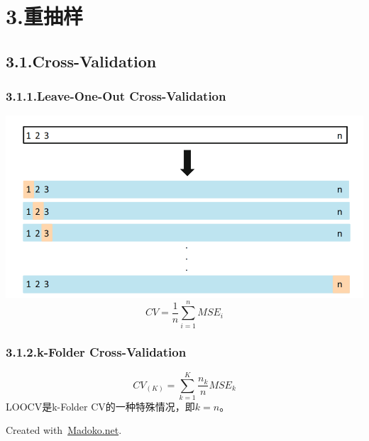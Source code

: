 \documentclass{article}
\begin{document}
{%
\section{3.\hspace*{0.5em}重抽样}\label{section}%

\subsection{3.1.\hspace*{0.5em}Cross-Validation}\label{sec-cross-validation}%

\subsubsection{3.1.1.\hspace*{0.5em}Leave-One-Out Cross-Validation}\label{sec-leave-one-out-cross-validation}%

\noindent{}\includegraphics[keepaspectratio=true,width=\dimmin{}{\dimwidth{0.80}}]{images/LOOCV}{}%
\label{}%
\noindent{}
\noindent\[%
  CV=\frac{1}{n}\sum_{i=1}^{n}MSE_i
\]%

\subsubsection{3.1.2.\hspace*{0.5em}k-Folder Cross-Validation}\label{sec-k-folder-cross-validation}%
\label{}%
\noindent{}
\noindent\[%
CV_{(K)}=\sum_{k=1}^{K}\frac{n_k}{n}MSE_k
\]%
\noindent{}LOOCV是k-Folder CV的一种特殊情况，即$k=n$。

\begin{mdbmargintb}{4em}{}%
\begin{mdflushright}%
{\tiny{}Created with~\href{https://www.madoko.net}{Madoko.net}.}%
\end{mdflushright}%
\end{mdbmargintb}%
}%
\end{document}
